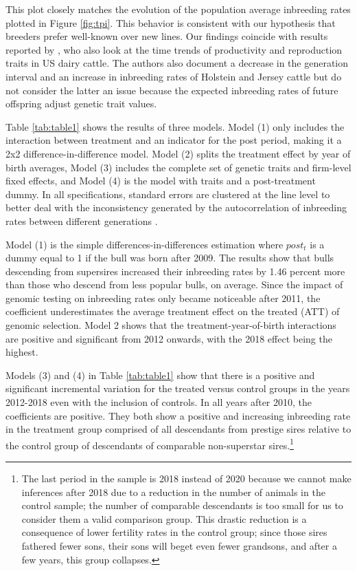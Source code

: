 \documentclass[12pt,letterpaper]{article}
\begin{document}
This plot closely matches the evolution of the population average inbreeding rates plotted in Figure \ref{fig:tpi}. This behavior is consistent with our hypothesis that breeders prefer well-known over new lines. 
Our findings coincide with results reported by \cite{Guinan2023}, who also look at the time trends of productivity and reproduction traits in US dairy cattle. 
The authors also document a decrease in the generation interval and an increase in inbreeding rates of Holstein and Jersey cattle but do not consider the latter an issue because the expected inbreeding rates of future offspring adjust genetic trait values.



Table \ref{tab:table1} shows the results of three models.  Model (1) only includes the interaction between treatment and an indicator for the post period, making it a 2x2 difference-in-difference model. Model (2) splits the treatment effect by year of birth averages, Model (3) includes the complete set of genetic traits and firm-level fixed effects, and Model (4) is the model with traits and a post-treatment dummy. In all specifications, standard errors are clustered at the line level to better deal with the inconsistency generated by the autocorrelation of inbreeding rates between different generations \citep{Bertrand2004}.

Model (1) is the simple differences-in-differences estimation where $post_{t}$ is a dummy equal to 1 if the bull was born after 2009. The results show that bulls descending from supersires increased their inbreeding rates by 1.46 percent more than those who descend from less popular bulls, on average. Since the impact of genomic testing on inbreeding rates only became noticeable after 2011, the coefficient underestimates the average treatment effect on the treated (ATT) of genomic selection. Model 2 shows that the treatment-year-of-birth interactions are positive and significant from 2012 onwards, with the 2018 effect being the highest.

Models (3) and (4) in Table \ref{tab:table1} show that there is a positive and significant incremental variation for the treated versus control groups in the years 2012-2018 even with the inclusion of controls. In all years after 2010, the coefficients are positive. 
They both show a positive and increasing inbreeding rate in the treatment group comprised of all descendants from prestige sires relative to the control group of descendants of comparable non-superstar sires.\footnote{The last period in the sample is 2018 instead of 2020 because we cannot make inferences after 2018 due to a reduction in the number of animals in the control sample; the number of comparable descendants is too small for us to consider them a valid comparison group. This drastic reduction is a consequence of lower fertility rates in the control group; since those sires fathered fewer sons, their sons will beget even fewer grandsons, and after a few years, this group collapses.} 
\end{document}
